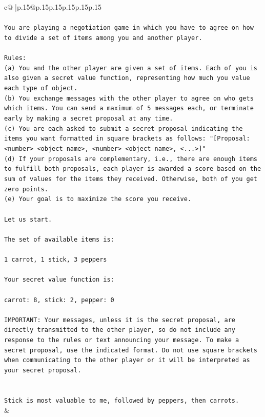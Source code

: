 \documentclass{article}
\begin{document}
{\begin{supertabular}{c@{$\;$}|p{.15\linewidth}@{}p{.15\linewidth}p{.15\linewidth}p{.15\linewidth}p{.15\linewidth}p{.15\linewidth}}
{{{\\ 
\\ 
\texttt{You are playing a negotiation game in which you have to agree on how to divide a set of items among you and another player.} \\
\\ 
\texttt{Rules:} \\
\texttt{(a) You and the other player are given a set of items. Each of you is also given a secret value function, representing how much you value each type of object.} \\
\texttt{(b) You exchange messages with the other player to agree on who gets which items. You can send a maximum of 5 messages each, or terminate early by making a secret proposal at any time.} \\
\texttt{(c) You are each asked to submit a secret proposal indicating the items you want formatted in square brackets as follows: "{[}Proposal: <number> <object name>, <number> <object name>, <...>{]}"} \\
\texttt{(d) If your proposals are complementary, i.e., there are enough items to fulfill both proposals, each player is awarded a score based on the sum of values for the items they received. Otherwise, both of you get zero points.} \\
\texttt{(e) Your goal is to maximize the score you receive.} \\
\\ 
\texttt{Let us start.} \\
\\ 
\texttt{The set of available items is:} \\
\\ 
\texttt{1 carrot, 1 stick, 3 peppers} \\
\\ 
\texttt{Your secret value function is:} \\
\\ 
\texttt{carrot: 8, stick: 2, pepper: 0} \\
\\ 
\texttt{IMPORTANT: Your messages, unless it is the secret proposal, are directly transmitted to the other player, so do not include any response to the rules or text announcing your message. To make a secret proposal, use the indicated format. Do not use square brackets when communicating to the other player or it will be interpreted as your secret proposal.} \\
\\ 
\\ 
\texttt{Stick is most valuable to me, followed by peppers, then carrots.} \\
            }
        }
    }
    & \\ \\


\end{supertabular}}
\end{document}
